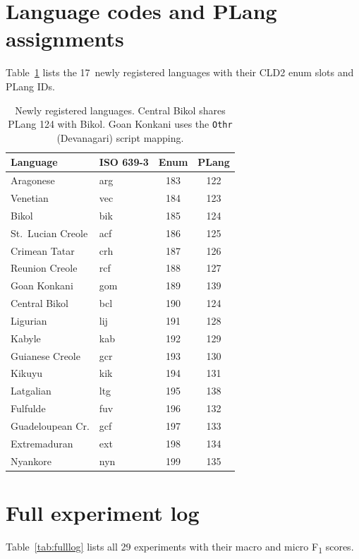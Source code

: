 \documentclass{article}
\newcommand{\fone}{F\textsubscript{1}}
\begin{document}



\appendix
\section{Language codes and PLang assignments}
\label{app:langs}

Table~\ref{tab:newlangs} lists the 17~newly registered languages with their CLD2 enum slots and PLang IDs.

\begin{table}[h]
\centering
\small
\begin{tabular}{@{}llcc@{}}
\toprule
Language & ISO 639-3 & Enum & PLang \\
\midrule
Aragonese & arg & 183 & 122 \\
Venetian & vec & 184 & 123 \\
Bikol & bik & 185 & 124 \\
St.\ Lucian Creole & acf & 186 & 125 \\
Crimean Tatar & crh & 187 & 126 \\
Reunion Creole & rcf & 188 & 127 \\
Goan Konkani & gom & 189 & 139 \\
Central Bikol & bcl & 190 & 124 \\
Ligurian & lij & 191 & 128 \\
Kabyle & kab & 192 & 129 \\
Guianese Creole & gcr & 193 & 130 \\
Kikuyu & kik & 194 & 131 \\
Latgalian & ltg & 195 & 138 \\
Fulfulde & fuv & 196 & 132 \\
Guadeloupean Cr. & gcf & 197 & 133 \\
Extremaduran & ext & 198 & 134 \\
Nyankore & nyn & 199 & 135 \\
\bottomrule
\end{tabular}
\caption{Newly registered languages. Central Bikol shares PLang 124 with Bikol. Goan Konkani uses the \texttt{Othr} (Devanagari) script mapping.}
\label{tab:newlangs}
\end{table}

\section{Full experiment log}
\label{app:experiments}

Table~\ref{tab:fulllog} lists all 29 experiments with their macro and micro \fone{} scores.
\end{document}
